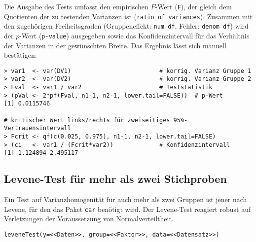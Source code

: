 Die Ausgabe des Tests umfasst den empirischen $F$-Wert (\lstinline!F!), der gleich dem Quotienten der zu testenden Varianzen ist (\lstinline!ratio of variances!). Zusammen mit den zugehörigen Freiheitsgraden (Gruppeneffekt: \lstinline!num df!, Fehler: \lstinline!denom df!) wird der $p$-Wert (\lstinline!p-value!) ausgegeben sowie das Konfidenzintervall für das Verhältnis der Varianzen in der gewünschten Breite. Das Ergebnis lässt sich manuell bestätigen:
\begin{lstlisting}
> var1  <- var(DV1)                         # korrig. Varianz Gruppe 1
> var2  <- var(DV2)                         # korrig. Varianz Gruppe 2
> Fval  <- var1 / var2                      # Teststatistik
> (pVal <- 2*pf(Fval, n1-1, n2-1, lower.tail=FALSE))  # p-Wert
[1] 0.0115746

# kritischer Wert links/rechts für zweiseitiges 95%-Vertrauensintervall
> Fcrit <- qf(c(0.025, 0.975), n1-1, n2-1, lower.tail=FALSE)
> (ci   <- var1 / (Fcrit*var2))             # Konfidenzintervall
[1] 1.124894 2.495117
\end{lstlisting}

\subsection{Levene-Test für mehr als zwei Stichproben}

Ein Test auf Varianzhomogenität für auch mehr als zwei Gruppen ist jener nach Levene, für den das Paket \lstinline!car! benötigt wird. Der Levene-Test reagiert robust auf Verletzungen der Voraussetzung von Normalverteiltheit.
\begin{lstlisting}
leveneTest(y=<<Daten>>, group=<<Faktor>>, data=<<Datensatz>>)
\end{lstlisting}

